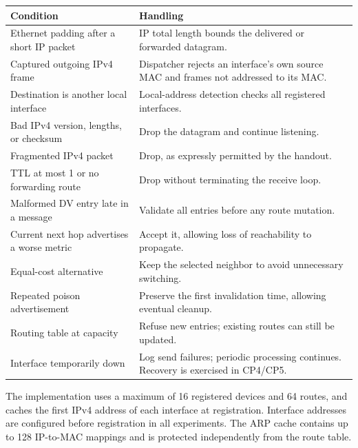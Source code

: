 \documentclass[
  a4paper,
  10pt]{article}
\newcounter{none} %
\begin{document}
{\def\LTcaptype{none} %
\begin{longtable}[]{@{}
  >{\raggedright\arraybackslash}p{}
  >{\raggedright\arraybackslash}p{}@{}}
\toprule\noalign{}
\begin{minipage}[b]{\linewidth}\raggedright
Condition
\end{minipage} & \begin{minipage}[b]{\linewidth}\raggedright
Handling
\end{minipage} \\
\midrule\noalign{}
\endhead
\bottomrule\noalign{}
\endlastfoot
Ethernet padding after a short IP packet & IP total length bounds the
delivered or forwarded datagram. \\
Captured outgoing IPv4 frame & Dispatcher rejects an interface's own
source MAC and frames not addressed to its MAC. \\
Destination is another local interface & Local-address detection checks
all registered interfaces. \\
Bad IPv4 version, lengths, or checksum & Drop the datagram and continue
listening. \\
Fragmented IPv4 packet & Drop, as expressly permitted by the handout. \\
TTL at most 1 or no forwarding route & Drop without terminating the
receive loop. \\
Malformed DV entry late in a message & Validate all entries before any
route mutation. \\
Current next hop advertises a worse metric & Accept it, allowing loss of
reachability to propagate. \\
Equal-cost alternative & Keep the selected neighbor to avoid unnecessary
switching. \\
Repeated poison advertisement & Preserve the first invalidation time,
allowing eventual cleanup. \\
Routing table at capacity & Refuse new entries; existing routes can
still be updated. \\
Interface temporarily down & Log send failures; periodic processing
continues. Recovery is exercised in CP4/CP5. \\
\end{longtable}
}

The implementation uses a maximum of 16 registered devices and 64
routes, and caches the first IPv4 address of each interface at
registration. Interface addresses are configured before registration in
all experiments. The ARP cache contains up to 128 IP-to-MAC mappings and
is protected independently from the route table.
\end{document}
